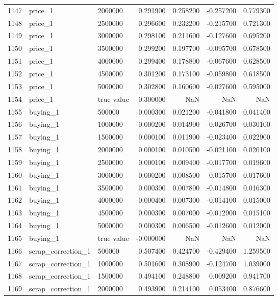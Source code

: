\begin{tabular}{lllrrrr}
1147 & price_1 & 2000000 & 0.291900 & 0.258200 & -0.257200 & 0.779300 \\
1148 & price_1 & 2500000 & 0.296600 & 0.232200 & -0.215700 & 0.721300 \\
1149 & price_1 & 3000000 & 0.298100 & 0.211600 & -0.127600 & 0.695200 \\
1150 & price_1 & 3500000 & 0.299200 & 0.197700 & -0.095700 & 0.678500 \\
1151 & price_1 & 4000000 & 0.299400 & 0.178800 & -0.067600 & 0.628500 \\
1152 & price_1 & 4500000 & 0.301200 & 0.173100 & -0.059800 & 0.618500 \\
1153 & price_1 & 5000000 & 0.302800 & 0.160600 & -0.027600 & 0.595000 \\
1154 & price_1 & true value & 0.300000 & NaN & NaN & NaN \\
1155 & buying_1 & 500000 & 0.000300 & 0.021200 & -0.041800 & 0.041400 \\
1156 & buying_1 & 1000000 & -0.000200 & 0.014900 & -0.026700 & 0.030100 \\
1157 & buying_1 & 1500000 & 0.000100 & 0.011900 & -0.023400 & 0.022900 \\
1158 & buying_1 & 2000000 & 0.000100 & 0.010500 & -0.021100 & 0.020100 \\
1159 & buying_1 & 2500000 & 0.000100 & 0.009400 & -0.017700 & 0.019600 \\
1160 & buying_1 & 3000000 & 0.000200 & 0.008500 & -0.015700 & 0.017600 \\
1161 & buying_1 & 3500000 & 0.000300 & 0.007800 & -0.014800 & 0.016300 \\
1162 & buying_1 & 4000000 & 0.000400 & 0.007300 & -0.014100 & 0.015000 \\
1163 & buying_1 & 4500000 & 0.000300 & 0.007000 & -0.012900 & 0.015100 \\
1164 & buying_1 & 5000000 & 0.000300 & 0.006500 & -0.012600 & 0.012000 \\
1165 & buying_1 & true value & -0.000000 & NaN & NaN & NaN \\
1166 & scrap_correction_1 & 500000 & 0.507400 & 0.424700 & -0.429400 & 1.259500 \\
1167 & scrap_correction_1 & 1000000 & 0.501600 & 0.308900 & -0.124700 & 1.039000 \\
1168 & scrap_correction_1 & 1500000 & 0.494100 & 0.248800 & 0.009200 & 0.941700 \\
1169 & scrap_correction_1 & 2000000 & 0.493900 & 0.214100 & 0.053400 & 0.876600 \\

\end{tabular}
